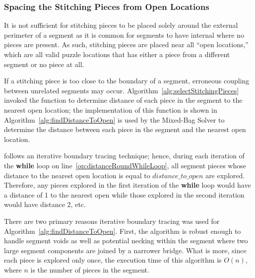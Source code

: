 \subsubsection{Spacing the Stitching Pieces from Open Locations}\label{sec:determiningSpacingToNearestOpenLocation}

It is not sufficient for stitching pieces to be placed solely around the external perimeter of a segment as it is common for segments to have internal where no pieces are present.  As such, stitching pieces are placed near all ``open locations,'' which are all valid puzzle locations that has either a piece from a different segment or no piece at all. 

If a stitching piece is too close to the boundary of a segment, erroneous coupling between unrelated segments may occur.  Algorithm~\ref{alg:selectStitchingPieces} invoked the function  to determine distance of each piece in the segment to the nearest open location; the implementation of this function is shown in Algorithm~\ref{alg:findDistanceToOpen} is used by the Mixed-Bag Solver to determine the distance between each piece in the segment and the nearest open location.  

 follows an iterative boundary tracing technique; hence, during each iteration of the \textbf{while} loop on line~\ref{op:distanceRoundWhileLoop}, all segment pieces whose distance to the nearest open location is equal to $distance\_to\_open$ are explored.  Therefore, any pieces explored in the first iteration of the \textbf{while} loop would have a distance of 1 to the nearest open while those explored in the second iteration would have distance 2, etc. 

There are two primary reasons iterative boundary tracing was used for Algorithm~\ref{alg:findDistanceToOpen}.  First, the algorithm is robust enough to handle segment voids as well as potential necking within the segment where two large segment components are joined by a narrower bridge. What is more, since each piece is explored only once, the execution time of this algorithm is $O(n)$, where $n$ is the number of pieces in the segment.


